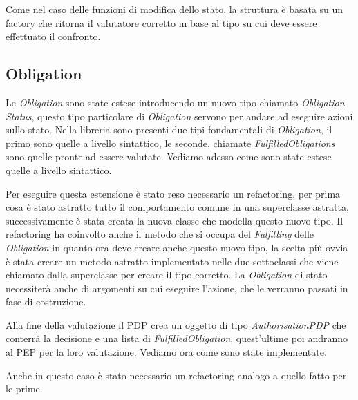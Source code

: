 Come nel caso delle funzioni di modifica dello stato, la struttura è basata su un factory che ritorna il valutatore corretto in base al tipo su cui deve essere effettuato il confronto.

\subsection{Obligation}
\label{sub:estensione_obligation}
Le \textit{Obligation} sono state estese introducendo un nuovo tipo chiamato \textit{Obligation Status}, questo tipo particolare di \textit{Obligation} servono per andare ad eseguire azioni sullo stato.
Nella libreria sono presenti due tipi fondamentali di \textit{Obligation}, il primo sono quelle a livello sintattico, le seconde, chiamate \textit{FulfilledObligations} sono quelle pronte ad essere valutate. Vediamo adesso come sono state estese quelle a livello sintattico.\\ \par
Per eseguire questa estensione è stato reso necessario un refactoring, per prima cosa è stato astratto tutto il comportamento comune in una superclasse astratta, successivamente è stata creata la nuova classe che modella questo nuovo tipo.
Il refactoring ha coinvolto anche il metodo che si occupa del \textit{Fulfilling} delle \textit{Obligation} in quanto ora deve creare anche questo nuovo tipo, la scelta più ovvia è stata creare un metodo astratto implementato nelle due sottoclassi che viene chiamato dalla superclasse per creare il tipo corretto.
La \textit{Obligation} di stato necessiterà anche di argomenti su cui eseguire l'azione, che le verranno passati in fase di costruzione.\\ \par
Alla fine della valutazione il PDP crea un oggetto di tipo \textit{AuthorisationPDP} che conterrà la decisione e una lista di \textit{FulfilledObligation}, quest'ultime poi andranno al PEP per la loro valutazione. Vediamo ora come sono state implementate.\\ \par
Anche in questo caso è stato necessario un refactoring analogo a quello fatto per le prime.
